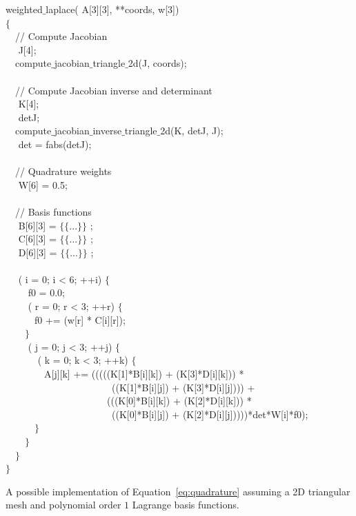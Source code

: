 \begin{algorithm}[h]
\scriptsize\ttfamily
{}

 weighted$\_$laplace( A[3][3],  **coords,  w[3]) \\
$\lbrace$ \\
~~// Compute Jacobian \\
~~ J[4]; \\
~~compute$\_$jacobian$\_$triangle$\_$2d(J, coords); \\
~~\\
~~// Compute Jacobian inverse and determinant \\
~~ K[4]; \\
~~ detJ; \\
~~compute$\_$jacobian$\_$inverse$\_$triangle$\_$2d(K, detJ, J); \\
~~ det = fabs(detJ); \\
~~\\
~~// Quadrature weights \\
~~ W[6] = {0.5}; \\
~~\\
~~// Basis functions \\
~~ B[6][3] = $\lbrace\lbrace$...$\rbrace\rbrace$ ;\\
~~ C[6][3] = $\lbrace\lbrace$...$\rbrace\rbrace$ ;\\
~~ D[6][3] = $\lbrace\lbrace$...$\rbrace\rbrace$ ;\\
~~\\
~~ ( i = 0; i < 6; ++i) $\lbrace$ \\
~~~~ f0  = 0.0;\\
~~~~ ( r  = 0; r < 3; ++r) $\lbrace$ \\
~~~~~~f0 += (w[r] * C[i][r]);\\
~~~~$\rbrace$ \\
~~~~ ( j = 0; j < 3; ++j) $\lbrace$\\
~~~~~~ ( k = 0; k < 3; ++k) $\lbrace$\\
~~~~~~~~A[j][k] += (((((K[1]*B[i][k]) + (K[3]*D[i][k])) * \\
~~~~~~~~~~~~~~~~~~~~~~((K[1]*B[i][j]) + (K[3]*D[i][j]))) + \\
~~~~~~~~~~~~~~~~~~~~~(((K[0]*B[i][k]) + (K[2]*D[i][k])) * \\
~~~~~~~~~~~~~~~~~~~~~~((K[0]*B[i][j]) + (K[2]*D[i][j]))))*det*W[i]*f0);\\
~~~~~~$\rbrace$\\
~~~~$\rbrace$\\
~~$\rbrace$\\
$\rbrace$
\caption{A possible implementation of Equation~\ref{eq:quadrature} assuming a 2D triangular mesh and polynomial order $1$ Lagrange basis functions.}
\label{code:weighted-laplace}
\end{algorithm}



